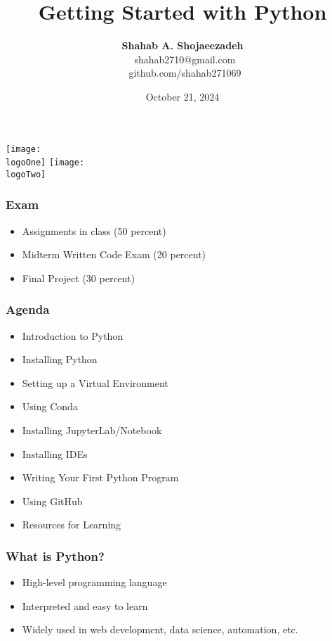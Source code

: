 \documentclass{beamer}
\title{\textbf{Getting Started with Python}}
\author{\textbf{Shahab A. Shojaeezadeh} \\ \faEnvelope \, shahab2710@gmail.com \\ \faGithub \, github.com/shahab271069}
\date{October 21, 2024}
\newcommand{\logoOne}{boku.png} %
\newcommand{\logoTwo}{uni-kassel.png} %
\begin{document}
\begin{frame}[plain] %
    \begin{center}
        \texttt{[image: \\logoOne]} %
        \hfill
        \texttt{[image: \\logoTwo]} %
        \titlepage
    \end{center}
\end{frame}




\begin{frame}
    \frametitle{Exam}
    \begin{itemize}
        \item Assignments in class (50 percent)
        \item Midterm Written Code Exam (20 percent)
        \item Final Project (30 percent)
    \end{itemize}
\end{frame}


\begin{frame}
    \frametitle{Agenda}
    \begin{itemize}
        \item Introduction to Python
        \item Installing Python
        \item Setting up a Virtual Environment
        \item Using Conda
        \item Installing JupyterLab/Notebook
        \item Installing IDEs
        \item Writing Your First Python Program
        \item Using GitHub
        \item Resources for Learning
    \end{itemize}
\end{frame}

\begin{frame}
    \frametitle{What is Python?}
    \begin{itemize}
        \item High-level programming language
        \item Interpreted and easy to learn
        \item Widely used in web development, data science, automation, etc.
    \end{itemize}
\end{frame}
\end{document}
